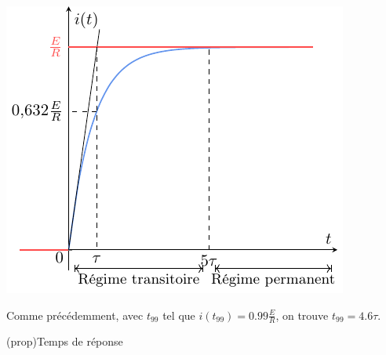 \documentclass[../../main/main.tex]{subfiles}
\begin{document}
\begin{tcbraster}[raster columns=2, raster equal height=rows]
\begin{tcb}
{			\includegraphics[width=\linewidth]{carac_rl-tau}
		}
	\end{tcb}
\end{tcbraster}

Comme précédemment, avec $t_{99}$ tel que $i(t_{99}) = \num{0.99}\frac{E}{R}$,
on trouve $t_{99} = \num{4.6}\tau$.
\begin{tcb}(prop){Temps de réponse}
	{}
\end{tcb}
\end{document}
